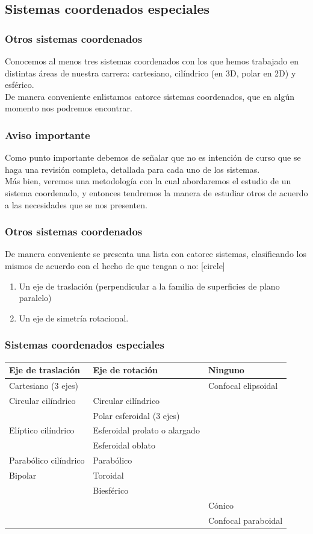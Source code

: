 \documentclass[12pt]{beamer}
\begin{document}
\subsection{Sistemas coordenados especiales}
\begin{frame}
\frametitle{Otros sistemas coordenados}
Conocemos al menos tres sistemas coordenados con los que hemos trabajado en distintas áreas de nuestra carrera: cartesiano, cilíndrico (en 3D, polar en 2D) y esférico.
\\
\bigskip
\pause
De manera conveniente enlistamos catorce sistemas coordenados, que en algún momento nos podremos encontrar.
\end{frame}
\begin{frame}
\frametitle{Aviso importante}
Como punto importante debemos de señalar que no es intención de curso que se haga una revisión completa, detallada para cada uno de los sistemas.
\\
\bigskip
\pause
Más bien, veremos una metodología con la cual abordaremos el estudio de un sistema coordenado, y entonces tendremos la manera de estudiar otros de acuerdo a las necesidades que se nos presenten.
\end{frame}
\begin{frame}
\frametitle{Otros sistemas coordenados}
De manera conveniente se presenta una lista con catorce sistemas, clasificando los mismos de acuerdo con el hecho de que tengan o no:
[circle]
\begin{enumerate}
\item Un eje de traslación (perpendicular a la familia de superficies de plano paralelo)
\item Un eje de simetría rotacional.
\end{enumerate}
\end{frame}
\begin{frame}
\frametitle{Sistemas coordenados especiales}
\fontsize{8}{8}\selectfont
{
\renewcommand{\arraystretch}{1.2}
\begin{table}[H]
\centering
\begin{tabular}{p{3cm} p{4cm} p{2.5cm}}
Eje de traslación & Eje de rotación & Ninguno \\ \hline
Cartesiano ($3$ ejes) & & Confocal elipsoidal \\
Circular cilíndrico & Circular cilíndrico & \\
& Polar esferoidal ($3$ ejes) & \\
Elíptico cilíndrico & Esferoidal prolato o alargado & \\
& Esferoidal oblato & \\
Parabólico cilíndrico & Parabólico & \\
Bipolar & Toroidal & \\
& Biesférico & \\[0.5em]
& & Cónico \\
& & Confocal paraboidal \\
\end{tabular}
\end{table}
}
\end{frame}
\end{document}
